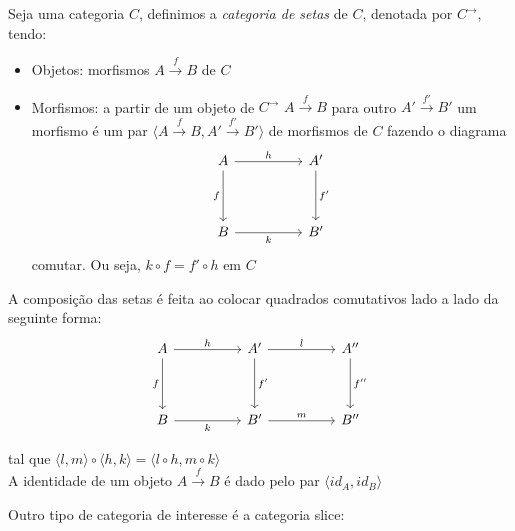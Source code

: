\documentclass[../main.tex]{subfiles}
\begin{document}
\begin{definition}
    Seja uma categoria $C$, definimos a \emph{categoria de setas} de $C$, denotada por $C^{\to}$, tendo:
    \begin{itemize}
        \item Objetos: morfismos $A \xrightarrow{f} B$ de $C$
        \item Morfismos: a partir de um objeto de $C^{\to}$ $A \xrightarrow{f} B$ para outro $A' \xrightarrow{f'} B'$ um morfismo é um par $\langle A \xrightarrow{f} B, A' \xrightarrow{f'} B' \rangle$ de morfismos de $C$ fazendo o diagrama
        \[\begin{tikzcd}
            A && {A'} \\
            \\
            B && {B'}
            \arrow["h", from=1-1, to=1-3]
            \arrow["f"', from=1-1, to=3-1]
            \arrow["{f'}", from=1-3, to=3-3]
            \arrow["k"', from=3-1, to=3-3]
        \end{tikzcd}\]
        comutar. Ou seja, $k \circ f = f' \circ h$ em $C$
    \end{itemize}

    A composição das setas é feita ao colocar quadrados comutativos lado a lado da seguinte forma:
    \[\begin{tikzcd}
        A && {A'} && {A''} \\
        \\
        B && {B'} && {B''}
        \arrow["h", from=1-1, to=1-3]
        \arrow["f"', from=1-1, to=3-1]
        \arrow["l", from=1-3, to=1-5]
        \arrow["{f'}", from=1-3, to=3-3]
        \arrow["{f''}", from=1-5, to=3-5]
        \arrow["k"', from=3-1, to=3-3]
        \arrow["m", from=3-3, to=3-5]
    \end{tikzcd}\]

    tal que $\langle l, m \rangle \circ \langle h, k \rangle = \langle l \circ h, m \circ k \rangle$
    \\
    A identidade de um objeto $A \xrightarrow{f} B$ é dado pelo par $\langle id_A, id_B \rangle$

\end{definition}

Outro tipo de categoria de interesse é a categoria slice:
\end{document}
